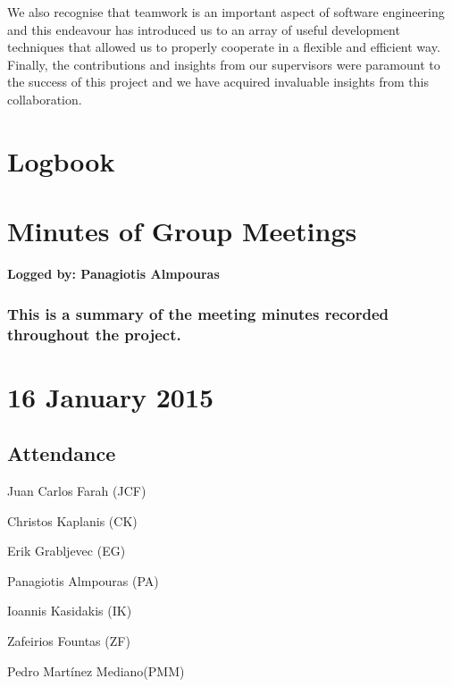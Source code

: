\documentclass[a4paper,11pt]{article}
\begin{document}
We also recognise that teamwork is an important aspect of software engineering and this endeavour has
introduced us to an array of useful development techniques that allowed us to properly cooperate in a flexible
and efficient way. Finally, the contributions and insights from our supervisors were paramount to the success of
this project and we have acquired invaluable insights from this collaboration.







\clearpage

{}

\clearpage
\appendix
\section{Logbook}

\clearpage
\section{Minutes of Group Meetings}
\textbf{Logged by: Panagiotis Almpouras}
\subsubsection*{This is a summary of the meeting minutes recorded throughout the project.}
\maketitle
\section*{16 January 2015}
\subsection*{Attendance}
\begin{compactenum}
\item Juan Carlos Farah (JCF)
\item Christos Kaplanis (CK)
\item Erik Grabljevec (EG)
\item Panagiotis Almpouras (PA)
\item Ioannis Kasidakis (IK)
\item Zafeirios Fountas (ZF)
\item Pedro Martínez Mediano(PMM)
\end{compactenum}
\end{document}
